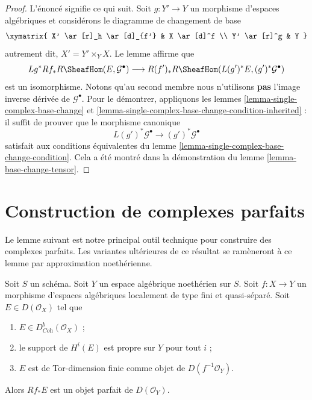 \begin{proof}
L'énoncé signifie ce qui suit. Soit $g : Y' \to Y$ un morphisme d'espaces
algébriques et considérons le diagramme de changement de base
$$
\xymatrix{
X' \ar[r]_h \ar[d]_{f'} &
X \ar[d]^f \\
Y' \ar[r]^g &
Y
}
$$
autrement dit, $X' = Y' \times_Y X$. Le lemme affirme que
$$
Lg^*Rf_*R\SheafHom(E, \mathcal{G}^\bullet)
\longrightarrow
R(f')_*R\SheafHom(L(g')^*E, (g')^*\mathcal{G}^\bullet)
$$
est un isomorphisme. Notons qu'au second membre nous n'utilisons {\bf pas}
l'image inverse dérivée de $\mathcal{G}^\bullet$. Pour le démontrer, appliquons les
lemmes \ref{lemma-single-complex-base-change} et
\ref{lemma-single-complex-base-change-condition-inherited} : il
suffit de prouver que le morphisme canonique
$$
L(g')^*\mathcal{G}^\bullet \to (g')^*\mathcal{G}^\bullet
$$
satisfait aux conditions équivalentes du
lemme \ref{lemma-single-complex-base-change-condition}.
Cela a été montré dans la démonstration du lemme \ref{lemma-base-change-tensor}.
\end{proof}

\section{Construction de complexes parfaits}
\label{section-producing-perfect}

\noindent
Le lemme suivant est notre principal outil technique pour construire des
complexes parfaits. Les variantes ult\'erieures de ce r\'esultat se ram\`eneront
\`a ce lemme par approximation noeth\'erienne.

\begin{lemma}
\label{lemma-perfect-direct-image}
Soit $S$ un sch\'ema. Soit $Y$ un espace alg\'ebrique noeth\'erien sur $S$.
Soit $f:X\to Y$ un morphisme d'espaces alg\'ebriques localement de type fini
et quasi-s\'epar\'e. Soit $E\in D(\mathcal{O}_X)$ tel que
\begin{enumerate}
\item $E\in D^b_{\textit{Coh}}(\mathcal{O}_X)$ ;
\item le support de $H^i(E)$ est propre sur $Y$ pour tout $i$ ;
\item $E$ est de Tor-dimension finie comme objet de
$D(f^{-1}\mathcal{O}_Y)$.
\end{enumerate}
Alors $Rf_*E$ est un objet parfait de $D(\mathcal{O}_Y)$.
\end{lemma}


